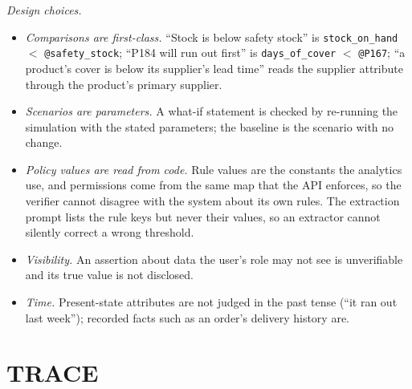 \documentclass[journal]{IEEEtran}
\renewcommand{\paragraph}[1]{\par\textit{#1}\enspace}
\newcommand{\attr}[1]{\texttt{#1}}
\begin{document}
\paragraph{Design choices.}
\begin{itemize}
\item \emph{Comparisons are first-class.} ``Stock is below safety stock'' is
\attr{stock\_on\_hand} $<$ \attr{@safety\_stock}; ``P184 will run out first'' is
\attr{days\_of\_cover} $<$ \attr{@P167}; ``a product's cover is below its supplier's lead time'' reads the
supplier attribute through the product's primary supplier.
\item \emph{Scenarios are parameters.} A what-if statement is checked by re-running the simulation with the
stated parameters; the baseline is the scenario with no change.
\item \emph{Policy values are read from code.} Rule values are the constants the analytics use, and
permissions come from the same map that the API enforces, so the verifier cannot disagree with the system
about its own rules. The extraction prompt lists the rule keys but never their values, so an extractor
cannot silently correct a wrong threshold.
\item \emph{Visibility.} An assertion about data the user's role may not see is unverifiable and its true
value is not disclosed.
\item \emph{Time.} Present-state attributes are not judged in the past tense (``it ran out last week'');
recorded facts such as an order's delivery history are.
\end{itemize}

\section{TRACE}
\label{sec:trace}
\end{document}
